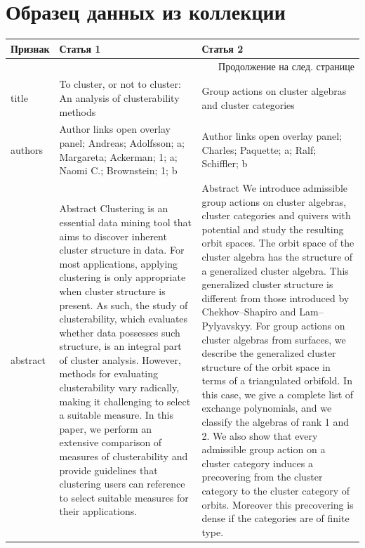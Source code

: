 \documentclass[12pt]{article}
\let\oldsection\section
\renewcommand{\section}{\clearpage\oldsection}
\begin{document}
\clearpage\appendix

\section{Образец данных из коллекции}
\label{appendix:raw_text_sample}

\begin{center}
	{\small \begin{tabularx}{\linewidth}{|l|X|X|}
			\hline
		Признак & Статья 1 &  Статья 2 \\
		\hline
		\endhead
		\hline
		\multicolumn{3}{r}{{Продолжение на след. странице}} \\
		\hline
		\endfoot
		
		\hline
		\endlastfoot
		title       &  To cluster, or not to cluster: An analysis of clusterability methods &  Group actions on cluster algebras and cluster categories \\
		\hline
		authors     &  Author links open overlay panel; Andreas; Adolfsson; a; Margareta; Ackerman; 1; a; Naomi C.; Brownstein; 1; b &  Author links open overlay panel; Charles; Paquette; a; Ralf; Schiffler; b \\
		\hline
		abstract    &  Abstract Clustering is an essential data mining tool that aims to discover inherent cluster structure in data. For most applications, applying clustering is only appropriate when cluster structure is present. As such, the study of clusterability, which evaluates whether data possesses such structure, is an integral part of cluster analysis. However, methods for evaluating clusterability vary radically, making it challenging to select a suitable measure. In this paper, we perform an extensive comparison of measures of clusterability and provide guidelines that clustering users can reference to select suitable measures for their applications. &  Abstract We introduce admissible group actions on cluster algebras, cluster categories and quivers with potential and study the resulting orbit spaces. The orbit space of the cluster algebra has the structure of a generalized cluster algebra. This generalized cluster structure is different from those introduced by Chekhov–Shapiro and Lam–Pylyavskyy. For group actions on cluster algebras from surfaces, we describe the generalized cluster structure of the orbit space in terms of a triangulated orbifold. In this case, we give a complete list of exchange polynomials, and we classify the algebras of rank 1 and 2. We also show that every admissible group action on a cluster category induces a precovering from the cluster category to the cluster category of orbits. Moreover this precovering is dense if the categories are of finite type. \\

\end{tabularx}}
\end{center}
\end{document}

